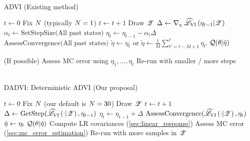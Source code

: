 %
\begin{minipage}{1.0\linewidth}
    \begin{minipage}[t]{0.49\linewidth}
        \begin{algorithm}[H]
        \caption{\\ADVI (Existing method)}\label{alg:sadvi}
        \begin{algorithmic}
            \State $t \gets 0$
            \State Fix $N$ (typically $N = 1$)
                \State $t \gets t + 1$
                \State Draw $\mathscr{Z}$
                \State $\Delta \gets \nabla_{\eta} \left. \widehat{\mathscr{L}}_{\mathrm{VI}}\left(\eta_{t-1} | \mathscr{Z}\right) \right.$
                \State $\alpha_t \gets \textrm{SetStepSize(All past states)}$
                \State $\eta_t \gets \eta_{t-1} - \alpha_t \Delta$
                \State $\textrm{AssessConvergence(All past states)}$
            \EndWhile
            \State $\tilde{\eta} \gets \eta_t$ or
                $\tilde{\eta} \gets \frac{1}{M} \sum_{t'=t- M + 1}^t \eta_{t'}$
            \State \Return $\mathcal{Q}(\theta \vert \tilde{\eta})$
        \EndProcedure

        \Postprocessing \hspace{1em}(If possible)
            \State Assess MC error using $\eta_1, \ldots, \eta_t$
                \State Re-run with smaller / more steps
            \EndIf
        \EndPostprocessing
        \end{algorithmic}
        \end{algorithm}
    \end{minipage}
    \begin{minipage}[t]{0.49\linewidth}
        \begin{algorithm}[H]
        \caption{\\DADVI: Deterministic ADVI (Our proposal)}\label{alg:dadvi}
        \begin{algorithmic}
            \State $t \gets 0$
            \State Fix $N$ (our default is $N = 30$)
            \State Draw $\mathscr{Z}$
                \State $t \gets t + 1$
                \State
    $\Delta \gets \textrm{GetStep}(\widehat{\mathscr{L}}_{\mathrm{VI}}\left(\cdot | \mathscr{Z}\right), \eta_{t-1})$
                \State $\eta_t \gets \eta_{t-1} + \Delta$
                \State $\textrm{AssessConvergence}(\widehat{\mathscr{L}}_{\mathrm{VI}}\left(\cdot | \mathscr{Z}\right), \eta_t)$
            \EndWhile
            \State $\hat{\eta} \gets \eta_t$
            \State \Return $\mathcal{Q}(\theta \vert \hat{\eta})$
        \EndProcedure
        \Postprocessing
            \State Compute LR covariances (\cref{sec:linear_response})
            \State Assess MC error (\cref{sec:mc_error_estimation})
                \State Re-run with more samples in $\mathscr{Z}$
            \EndIf
        \EndPostprocessing
        \end{algorithmic}
        \end{algorithm}
    \end{minipage}
\end{minipage}
